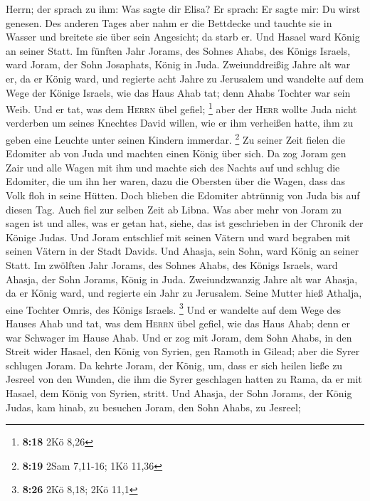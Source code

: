 Herrn; der sprach zu ihm: Was sagte dir Elisa? Er sprach: Er sagte mir:
Du wirst genesen.  Des anderen Tages aber nahm er die
Bettdecke und tauchte sie in Wasser und breitete sie über sein
Angesicht; da starb er. Und Hasael ward König an seiner Statt.
 Im fünften Jahr Jorams, des Sohnes Ahabs, des Königs
Israels, ward Joram, der Sohn Josaphats, König in Juda. 
Zweiunddreißig Jahre alt war er, da er König ward, und regierte acht
Jahre zu Jerusalem  und wandelte auf dem Wege der Könige
Israels, wie das Haus Ahab tat; denn Ahabs Tochter war sein Weib. Und er
tat, was dem \textsc{Herrn} übel gefiel; \footnote{\textbf{8:18} 2Kö
  8,26}  aber der \textsc{Herr} wollte Juda nicht
verderben um seines Knechtes David willen, wie er ihm verheißen hatte,
ihm zu geben eine Leuchte unter seinen Kindern immerdar. \footnote{\textbf{8:19}
  2Sam 7,11-16; 1Kö 11,36}  Zu seiner Zeit fielen die
Edomiter ab von Juda und machten einen König über sich. 
Da zog Joram gen Zair und alle Wagen mit ihm und machte sich des Nachts
auf und schlug die Edomiter, die um ihn her waren, dazu die Obersten
über die Wagen, dass das Volk floh in seine Hütten.  Doch
blieben die Edomiter abtrünnig von Juda bis auf diesen Tag. Auch fiel
zur selben Zeit ab Libna.  Was aber mehr von Joram zu
sagen ist und alles, was er getan hat, siehe, das ist geschrieben in der
Chronik der Könige Judas.  Und Joram entschlief mit
seinen Vätern und ward begraben mit seinen Vätern in der Stadt Davids.
Und Ahasja, sein Sohn, ward König an seiner Statt.  Im
zwölften Jahr Jorams, des Sohnes Ahabs, des Königs Israels, ward Ahasja,
der Sohn Jorams, König in Juda.  Zweiundzwanzig Jahre alt
war Ahasja, da er König ward, und regierte ein Jahr zu Jerusalem. Seine
Mutter hieß Athalja, eine Tochter Omris, des Königs Israels. \footnote{\textbf{8:26}
  2Kö 8,18; 2Kö 11,1}  Und er wandelte auf dem Wege des
Hauses Ahab und tat, was dem \textsc{Herrn} übel gefiel, wie das Haus
Ahab; denn er war Schwager im Hause Ahab.  Und er zog mit
Joram, dem Sohn Ahabs, in den Streit wider Hasael, den König von Syrien,
gen Ramoth in Gilead; aber die Syrer schlugen Joram.  Da
kehrte Joram, der König, um, dass er sich heilen ließe zu Jesreel von
den Wunden, die ihm die Syrer geschlagen hatten zu Rama, da er mit
Hasael, dem König von Syrien, stritt. Und Ahasja, der Sohn Jorams, der
König Judas, kam hinab, zu besuchen Joram, den Sohn Ahabs, zu Jesreel;
